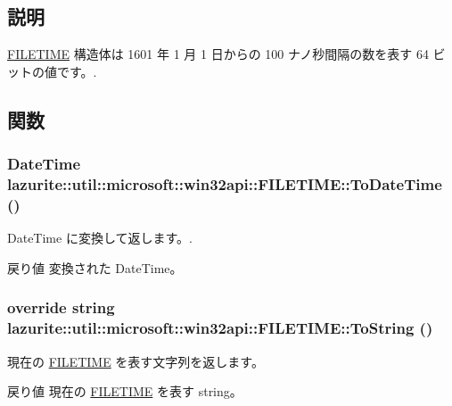 \subsection{説明}
\hyperlink{structlazurite_1_1util_1_1microsoft_1_1win32api_1_1_f_i_l_e_t_i_m_e}{FILETIME} 構造体は 1601 年 1 月 1 日からの 100 ナノ秒間隔の数を表す 64 ビットの値です。. 

\subsection{関数}
\hypertarget{structlazurite_1_1util_1_1microsoft_1_1win32api_1_1_f_i_l_e_t_i_m_e_a485d3625eb0f98f02fa762b65b2c8456}{
\subsubsection[{ToDateTime}]{\setlength{\rightskip}{0pt plus 5cm}DateTime lazurite::util::microsoft::win32api::FILETIME::ToDateTime ()}}
\label{structlazurite_1_1util_1_1microsoft_1_1win32api_1_1_f_i_l_e_t_i_m_e_a485d3625eb0f98f02fa762b65b2c8456}


DateTime に変換して返します。. \begin{DoxyReturn}{戻り値}
変換された DateTime。
\end{DoxyReturn}
\hypertarget{structlazurite_1_1util_1_1microsoft_1_1win32api_1_1_f_i_l_e_t_i_m_e_a60e10d02bb318f08df009efb372cc799}{
\subsubsection[{ToString}]{\setlength{\rightskip}{0pt plus 5cm}override string lazurite::util::microsoft::win32api::FILETIME::ToString ()}}
\label{structlazurite_1_1util_1_1microsoft_1_1win32api_1_1_f_i_l_e_t_i_m_e_a60e10d02bb318f08df009efb372cc799}


現在の \hyperlink{structlazurite_1_1util_1_1microsoft_1_1win32api_1_1_f_i_l_e_t_i_m_e}{FILETIME} を表す文字列を返します。 \begin{DoxyReturn}{戻り値}
現在の \hyperlink{structlazurite_1_1util_1_1microsoft_1_1win32api_1_1_f_i_l_e_t_i_m_e}{FILETIME} を表す string。
\end{DoxyReturn}


